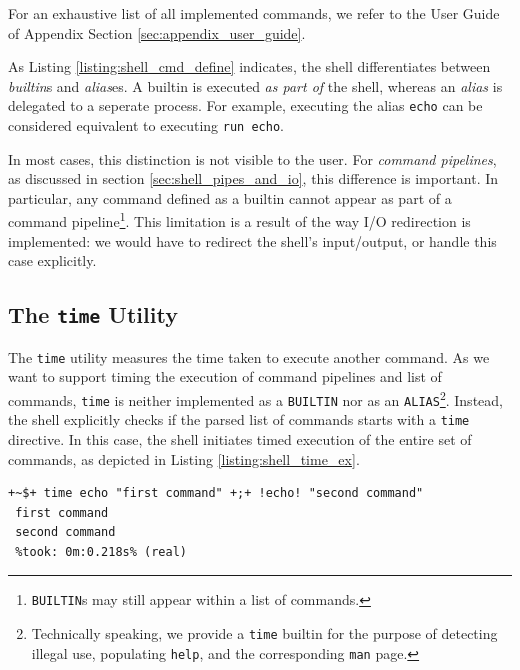 For an exhaustive list of all implemented commands, we refer to the User Guide of Appendix Section \ref{sec:appendix_user_guide}.

As Listing \ref{listing:shell_cmd_define} indicates, the shell differentiates between \emph{builtin}s and \emph{alias}es. A builtin is executed \emph{as part of} the shell, whereas an \emph{alias} is delegated to a seperate process.  For example, executing the alias \texttt{echo} can be considered equivalent to executing \texttt{run echo}.

In most cases, this distinction is not visible to the user. For \emph{command pipelines}, as discussed in section \ref{sec:shell_pipes_and_io}, this difference is important. In particular, any command defined as a builtin cannot appear as part of a command pipeline\footnote{\texttt{BUILTIN}s may still appear within a list of commands.}. This limitation is a result of the way I/O redirection is implemented: we would have to redirect the shell's input/output, or handle this case explicitly.

\subsection{The \texttt{time} Utility}

The \texttt{time} utility measures the time taken to execute another command. As we want to support timing the execution of command pipelines and list of commands, \texttt{time} is neither implemented as a \texttt{BUILTIN} nor as an \texttt{ALIAS}\footnote{Technically speaking, we provide a \texttt{time} builtin for the purpose of detecting illegal use, populating \texttt{help}, and the corresponding \texttt{man} page.}. Instead, the shell explicitly checks if the parsed list of commands starts with a \texttt{time} directive. In this case, the shell initiates timed execution of the entire set of commands, as depicted in Listing \ref{listing:shell_time_ex}.

\begin{lstlisting}[style=ShellInputStyle, caption={Timing the Execution of a List of Commands}, deletekeywords={echo, command}, label={listing:shell_time_ex}]
 +~$+ time echo "first command" +;+ !echo! "second command"
 first command
 second command
 %took: 0m:0.218s% (real)
\end{lstlisting}

